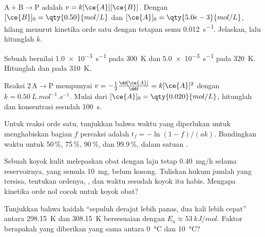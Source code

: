 \begin{exercise}[$\star\star$]\label{exo:b1:rate-laws:7}
 $\mathrm{A} + \mathrm{B} \longrightarrow \mathrm{P}$ adalah $v = k[\ce{A}][\ce{B}]$. Dengan
$[\ce{B}]_0 = \qty{0.50}{mol/L}$ dan $[\ce{A}]_0 = \qty{5.0e-3}{mol/L}$,
 hilang menurut kinetika orde satu dengan tetapan semu
\qty{0.012}{s^{-1}}. Jelaskan, lalu hitunglah $k$.
\end{exercise}

\begin{exercise}[$\star\star$]\label{exo:b1:rate-laws:8}
Sebuah  bernilai \qty{1.0e-3}{s^{-1}} pada \qty{300}{K} dan
\qty{5.0e-3}{s^{-1}} pada \qty{320}{K}. Hitunglah  dan
 pada \qty{310}{K}.
\end{exercise}

\begin{exercise}[$\star\star$]\label{exo:b1:rate-laws:9}
Reaksi $2\,\mathrm{A} \longrightarrow \mathrm{P}$ mempunyai  $v = -\frac12\frac{\dd[\ce{A}]}
{\dd t} = k[\ce{A}]^2$ dengan $k = \qty{0.50}{L.mol^{-1}.s^{-1}}$. Mulai
dari $[\ce{A}]_0 = \qty{0.020}{mol/L}$, hitunglah  dan
konsentrasi sesudah \qty{100}{s}.
\end{exercise}

\begin{exercise}[$\star\star\star$]\label{exo:b1:rate-laws:10}
Untuk reaksi orde satu, tunjukkan bahwa waktu yang diperlukan untuk
menghabiskan bagian $f$ pereaksi adalah $t_f = -\ln(1 - f)/(ak)$.
Bandingkan waktu untuk 50\,\%, 75\,\%, 90\,\%, dan 99.9\,\%, dalam
satuan .
\end{exercise}

\begin{exercise}[$\star\star\star$]\label{exo:b1:rate-laws:11}
Sebuah koyok kulit melepaskan obat dengan laju tetap \qty{0.40}{mg/h}
selama reservoirnya, yang semula \qty{10}{mg}, belum kosong. Tuliskan
hukum jumlah yang tersisa, tentukan ordenya, , dan waktu
sesudah koyok itu habis. Mengapa kinetika orde nol cocok untuk koyok
obat?
\end{exercise}

\begin{exercise}[$\star\star\star$]\label{exo:b1:rate-laws:12}
Tunjukkan bahwa kaidah ``sepuluh derajat lebih panas, dua kali lebih
cepat'' antara \qty{298.15}{K} dan \qty{308.15}{K} bersesuaian dengan
$E_a \approx
\qty{53}{kJ/mol}$. Faktor berapakah yang diberikan  yang
sama antara \qty{0}{\celsius} dan \qty{10}{\celsius}?
\end{exercise}

